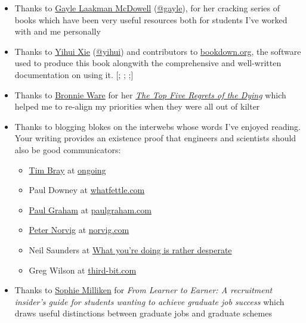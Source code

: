 \documentclass[
]{book}
\providecommand{\tightlist}{%
  \setlength{\itemsep}{0pt}\setlength{\parskip}{0pt}}
\begin{document}
\begin{itemize}
\tightlist
\item
  Thanks to \href{https://en.wikipedia.org/wiki/Gayle_Laakmann_McDowell}{Gayle Laakman McDowell} (\href{https://twitter.com/gayle}{@gayle}), for her cracking series of books \citep{techcareer, cracking, crackingpm, crackingthepmcareer} which have been very useful resources both for students I've worked with and me personally
\item
  Thanks to \href{https://en.wikipedia.org/wiki/Yihui_Xie}{Yihui Xie} (\href{https://github.com/yihui}{@yihui}) and contributors to \href{https://bookdown.org}{bookdown.org}, the software used to produce this book alongwith the comprehensive and well-written documentation on using it. {[}\citet{xie2017}; \citet{xie2015}; \citet{xie2020};{]}
\item
  Thanks to \href{https://en.wikipedia.org/wiki/Bronnie_Ware}{Bronnie Ware} for her \emph{\href{https://en.wikipedia.org/wiki/The_Top_Five_Regrets_of_the_Dying}{The Top Five Regrets of the Dying}} \citep{regrets} which helped me to re-align my priorities when they were all out of kilter
\item
  Thanks to blogging blokes on the interwebs whose words I've enjoyed reading. Your writing provides an existence proof that engineers and scientists should also be good communicators:

  \begin{itemize}
  \tightlist
  \item
    \href{https://en.wikipedia.org/wiki/Tim_Bray}{Tim Bray} at \href{https://www.tbray.org/ongoing/}{ongoing}
  \item
    Paul Downey at \href{https://blog.whatfettle.com/}{whatfettle.com}
  \item
    \href{https://en.wikipedia.org/wiki/Paul_Graham_(programmer)}{Paul Graham} at \href{http://paulgraham.com/}{paulgraham.com}
  \item
    \href{https://en.wikipedia.org/wiki/Peter_Norvig}{Peter Norvig} at \href{https://norvig.com/}{norvig.com}
  \item
    Neil Saunders at \href{https://nsaunders.wordpress.com/blog/}{What you're doing is rather desperate}
  \item
    Greg Wilson at \href{https://third-bit.com/}{third-bit.com}
  \end{itemize}
\item
  Thanks to \href{https://twitter.com/SRS_Sophie}{Sophie Milliken} for \emph{From Learner to Earner: A recruitment insider's guide for students wanting to achieve graduate job success} \citep{milliken} which draws useful distinctions between graduate jobs and graduate schemes
\end{itemize}
\end{document}
